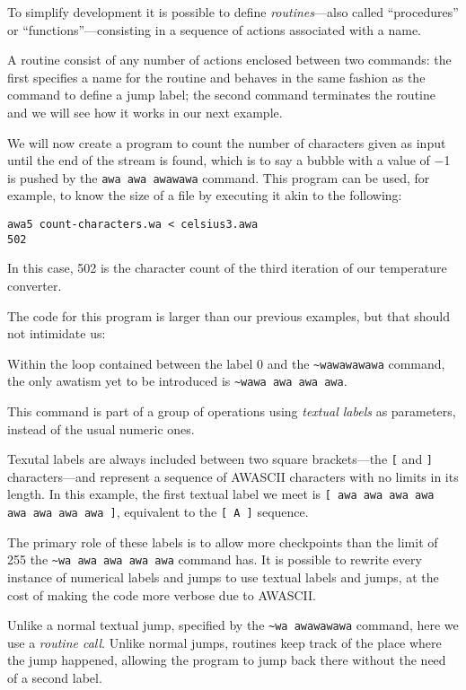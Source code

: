 \documentclass[11pt,a4paper,draft]{book}
\begin{document}
To simplify development it is possible to define
\emph{routines}---also called \enquote{procedures} or
\enquote{functions}---consisting in a sequence of actions associated
with a name.

A routine consist of any number of actions enclosed between two
commands: the first specifies a name for the routine and behaves in
the same fashion as the command to define a jump label; the second
command terminates the routine and we will see how it works in our
next example.

We will now create a program to count the number of characters given
as input until the end of the stream is found, which is to say a
bubble with a value of \num{-1} is pushed by the
\verb|awa awa awawawa| command. This program can be used, for example,
to know the size of a file by executing it akin to the following:
\begin{verbatim}
awa5 count-characters.wa < celsius3.awa
502
\end{verbatim}

In this case, \num{502} is the character count of the third iteration
of our temperature converter.

The code for this program is larger than our previous examples, but
that should not intimidate us:


Within the loop contained between the label \num{0} and the
\verb|~wawawawawa| command, the only awatism yet to be introduced is
\verb|~wawa awa awa awa|.

This command is part of a group of operations using \emph{textual
labels} as parameters, instead of the usual numeric ones.

Texutal labels are always included between two square brackets---the
\verb|[| and \verb|]| characters---and represent a sequence of AWASCII
characters with no limits in its length.  In this example, the first
textual label we meet is \verb|[ awa awa awa awa awa awa awa awa ]|,
equivalent to the \verb|[ A ]| sequence.

The primary role of these labels is to allow more checkpoints than the
limit of \num{255} the \verb|~wa awa awa awa awa| command has. It is
possible to rewrite every instance of numerical labels and jumps to
use textual labels and jumps, at the cost of making the code more
verbose due to AWASCII.

Unlike a normal textual jump, specified by the \verb|~wa awawawawa|
command, here we use a \emph{routine call}. Unlike normal jumps,
routines keep track of the place where the jump happened, allowing the
program to jump back there without the need of a second label.
\end{document}
